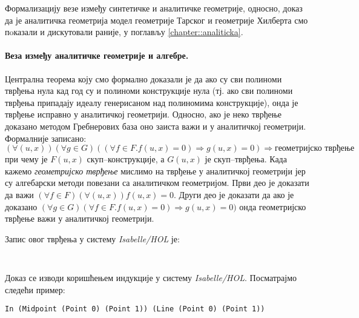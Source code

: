 Формализацију везе између синтетичке и аналитичке геометрије, односно,
доказ да је аналитичка геометрија модел геометрије Тарског и
геометрије Хилберта смо пoказали и дискутовали раније, у поглављу
\ref{chapter::analiticka}.


\paragraph{Веза између аналитичке геометрије и алгебре.}
Централна теорема коју смо формално доказали је да ако су сви полиноми
тврђења нула кад год су и полиноми конструкције нула (тј. ако сви
полиноми тврђења припадају идеалу генерисаном над полиномима
конструкције), онда је тврђење исправно у аналитичкој
геометрији. Односно, ако је неко тврђење доказано методом Гребнерових
база оно заиста важи и у аналитичкој геометрији. Формалније записано:
\[
(\forall (u, x))(\forall g\in G)( (\forall f\in F. f(u,x) = 0) \Rightarrow g(u,x) = 0) \Rightarrow \textrm{геометријско тврђење} \nonumber
\]
при чему је $F(u, x)$ скуп--конструкције, а $G(u, x)$ је
скуп--тврђења. Када кажемо {\em геометријско тврђење} мислимо на
тврђење у аналитичкој геометрији јер су алгебарски методи повезани са
аналитичком геометријом. Први део је доказати да важи $(\forall f \in
F)(\forall (u,x))f(u,x) = 0$. Други део је доказати да ако је доказано
$(\forall g\in G)(\forall f\in F. f(u,x) = 0) \Rightarrow g(u,x) = 0)$
онда геометријско тврђење важи у аналитичкој геометрији. 

Запис овог тврђења у систему \emph{Isabelle/HOL} је:
{\tt
\begin{tabbing}
\textbf{theorem} "}\textbf{let} ($cp$, $sp$) = algebrize term \textbf{in} \\
(\textbf{ALL} $ass$\=. (\= (\textbf{ALL} $p$ : $cp$. eval\_poly $ass$ $p$ = 0) $\longrightarrow$ \\
     \>                 \> (\textbf{ALL} $p$ : $sp$. eval\_poly $ass$ $p$ = 0)) $\longrightarrow$ \\
     \> AnalyticGeometry.valid $s$)"}
\end{tabbing}
}

 Доказ се изводи коришћењем индукције у систему
 \emph{Isabelle/HOL}. Посматрајмо следећи пример:

{\tt In (Midpoint (Point 0) (Point 1)) (Line (Point 0) (Point 1))}\\

